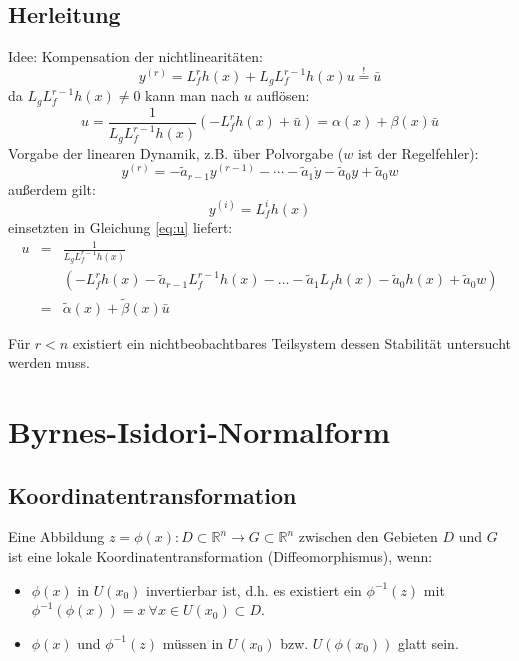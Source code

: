 \subsection{Herleitung}
Idee: Kompensation der nichtlinearitäten:
\begin{equation}
    y^{(r)} = L_f^r h(x) + L_g L_f^{r-1} h(x) u \stackrel{!}{=} \bar{u}
\end{equation}
da $L_g L_f^{r-1} h(x) \neq 0$ kann man nach $u$ auflösen:
\begin{equation} \label{eq:u}
    u = \frac{1}{L_g L_f^{r-1} h(x)} \left(-L_f^r h(x) + \bar{u} \right)
      = \alpha(x) + \beta(x) \bar{u}
\end{equation}
Vorgabe der linearen Dynamik, z.B. über Polvorgabe ($w$ ist der Regelfehler):
\begin{equation}
    y^{(r)} = - \tilde{a}_{r-1} y^{(r-1)} - \cdots - \tilde{a}_1 \dot{y} - \tilde{a}_0 y +
        \tilde{a}_0 w
\end{equation}
außerdem gilt:
\begin{equation}
    y^{(i)} = L_f^i h(x)
\end{equation}
einsetzten in Gleichung \ref{eq:u} liefert:
\begin{eqnarray}
    u &=& \frac{1}{L_g L_f^{r-1} h(x)} \\
        &&\left(-L_f^r h(x) - \tilde{a}_{r-1} L_f^{r-1} h(x) - \ldots - \tilde{a}_1 L_f h(x) - \tilde{a}_0 h(x) + \tilde{a}_0 w \right) \\
      &=& \tilde{\alpha}(x) + \tilde{\beta}(x) \bar{u}
\end{eqnarray}

Für $r<n$ existiert ein nichtbeobachtbares Teilsystem dessen Stabilität untersucht werden
muss.

\section{Byrnes-Isidori-Normalform}
\subsection{Koordinatentransformation}
Eine Abbildung $z = \phi(x): D \subset \mathbb{R}^n \to G \subset \mathbb{R}^n$ zwischen
den Gebieten $D$ und $G$ ist eine lokale Koordinatentransformation (Diffeomorphismus),
wenn:
\begin{itemize}
    \item
        $\phi(x)$ in $U(x_0)$ invertierbar ist, d.h. es existiert ein $\phi^{-1}(z)$ mit
        $\phi^{-1}(\phi(x)) = x\ \forall x \in U(x_0) \subset D$.
    \item
        $\phi(x)$ und $\phi^{-1}(z)$ müssen in $U(x_0)$ bzw. $U(\phi(x_0))$ glatt
        sein. 
\end{itemize}

